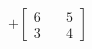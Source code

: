 \documentclass[preview]{standalone}
\begin{document}
\begin{align*}
+\begin{bmatrix} 6 & \quad 5 \\ 3 & \quad 4 \end{bmatrix}
\end{align*}
\end{document}
